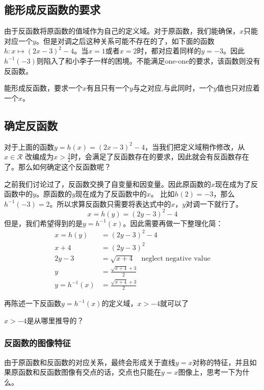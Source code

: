 \subsection*{能形成反函数的要求}
\label{subsec:Requirements}
由于反函数将原函数的值域作为自己的定义域。对于原函数，我们能确保，$x$只能对应一个$y$。但是对调之后这种关系可能不存在的了，如下面的函数
$h: x\mapsto (2x-3)^2-4$。当$x=1$或者$x=2$时，都对应着同样的$y=-3$。因此$h^{-1}(-3)$则陷入了和小李子一样的困境。不能满足one-one的要求，该函数则没有反函数。

\begin{SummBox}
能形成反函数，要求一个$x$有且只有一个$y$与之对应,与此同时，一个$y$值也只对应着一个$x$。
\end{SummBox}

\subsection*{确定反函数}
\label{subsec:Find Inverse}
对于上面的函数$y=h(x)=(2x-3)^2-4$，当我们把定义域稍作修改，从$x\in \mathcal{R}$ 改编成为$x>\frac{3}{2}$时，会满足了反函数存在的要求，因此就会有反函数存在了。那么如何确定这个反函数呢？

之前我们讨论过了，反函数交换了自变量和因变量。因此原函数的$x$现在成为了反函数中的$y$。原函数的$y$现在成为了反函数中的$x$。
比如$h(2)=-3$，那么$h^{-1}(-3)=2$。所以求算反函数只需要将表达式中的$x$，$y$对调一下就行了。
\[x=h(y)=(2y-3)^2-4\]
但是，我们希望得到的是$y=h^{-1}(x)$。因此需要再做一下整理化简：
\begin{align*}
x=h(y) &= (2y-3)^2-4\\
 x+4   &=(2y-3)^2\\
  2y-3 &=\sqrt {x+4} \quad \text{neglect negative value}\\
  y    &=\frac{\sqrt{x+4}+3}{2}\\
  y=h^{-1}(x) &=\frac{\sqrt{x+4}+3}{2}
\end{align*}

再陈述一下反函数$y=h^{-1}(x)$的定义域，$x>-4$就可以了

\begin{TaskBox}
$x>-4$是从哪里推导的？
\end{TaskBox}

\subsubsection*{反函数的图像特征}
\label{subsec:Graphic Charcteristic}
由于原函数和反函数的对应关系，最终会形成关于直线$y=x$对称的特征，并且如果原函数和反函数图像有交点的话，交点也只能在$y=x$图像上，思考一下为什么。


